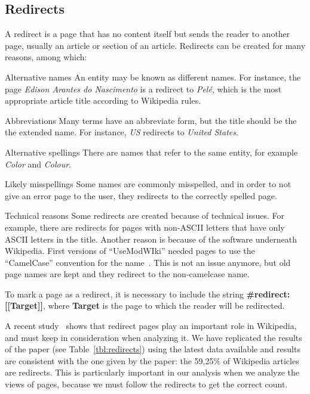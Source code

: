\subsection{Redirects}
A redirect is a page that has no content itself but sends the reader to another page, usually an article or section of an article.
Redirects can be created for many reasons, among which:
\begin{description*}
    \item[Alternative names] An entity may be known as different names.
    For instance, the page \emph{Edison Arantes do Nascimento} is a redirect to \emph{Pelé}, which is the most appropriate article title according to Wikipedia rules.
    \item[Abbreviations] Many terms have an abbreviate form, but the title should be the the extended name.
    For instance, \emph{US} redirects to \emph{United States}.
    \item[Alternative spellings] There are names that refer to the same entity, for example \emph{Color} and \emph{Colour}.
    \item[Likely misspellings] Some names are commonly misspelled, and in order to not give an error page to the user, they redirects to the correctly spelled page.
    \item[Technical reasons] Some redirects are created because of technical issues.
    For example, there are redirects for pages with non-ASCII letters that have only ASCII letters in the title.
    Another reason is because of the software underneath Wikipedia.
    First versions of ``UseModWIki'' needed pages to use the ``CamelCase'' convention for the name~\cite{wiki:camelcase}.
    This is not an issue anymore, but old page names are kept and they redirect to the non-camelcase name.
\end{description*}

To mark a page as a redirect, it is necessary to include the string \textbf{\#redirect: [[Target]]}, where \textbf{Target} is the page to which the reader will be redirected.

A recent study~\cite{Hill2014} shows that redirect pages play an important role in Wikipedia, and must keep in consideration when analyzing it.
We have replicated the results of the paper (see Table~\ref{tbl:redirects}) using the latest data available and results are consistent with the one given by the paper: the 59,25\% of Wikipedia articles are redirects.
This is particularly important in our analysis when we analyze the views of pages, because we must follow the redirects to get the correct count.

